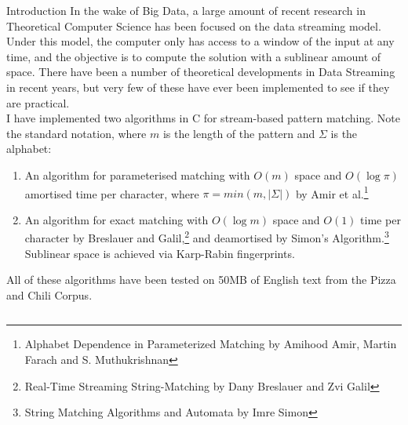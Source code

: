 \documentclass[ %
                    author={Dominic Moylett},
                supervisor={Dr. Raphael Clifford, Dr. Markus Jalsenius and Dr. Benjamin Sach},
                     title={An Empirical Analysis of Data Streaming Algorithms},
                  subtitle={},
                    degree={MEng},
                      year={2014} ]{poster}
\begin{document}

\begin{frame}{} 

\vfill

\begin{columns}[t]
  \begin{column}{0.900\linewidth}
  \begin{block}{\Large Introduction}
  In the wake of Big Data, a large amount of recent research in Theoretical Computer Science has been focused on the data streaming model. Under this model, the computer only has access to a window of the input at any time, and the objective is to compute the solution with a sublinear amount of space. There have been a number of theoretical developments in Data Streaming in recent years, but very few of these have ever been implemented to see if they are practical.\\
  \vspace{\baselineskip}
  I have implemented two algorithms in C for stream-based pattern matching. Note the standard notation, where $m$ is the length of the pattern and $\Sigma$ is the alphabet:
  \begin{enumerate}
  \item An algorithm for parameterised matching with $O(m)$ space and $O(\log\pi)$ amortised time per character, where $\pi=min(m, \left|\Sigma\right|)$ by Amir et al.\footnote{Alphabet Dependence in Parameterized Matching by Amihood Amir, Martin Farach and S. Muthukrishnan}
  \item An algorithm for exact matching with $O(\log m)$ space and $O(1)$ time per character by Breslauer and Galil,\footnote{Real-Time Streaming String-Matching by Dany Breslauer and Zvi Galil} and deamortised by Simon's Algorithm.\footnote{String Matching Algorithms and Automata by Imre Simon} Sublinear space is achieved via Karp-Rabin fingerprints.
  \end{enumerate}

  \noindent
  All of these algorithms have been tested on 50MB of English text from the Pizza and Chili Corpus.
  \end{block}
  \end{column}
\end{columns}

\vfill


\end{frame}
\end{document}

